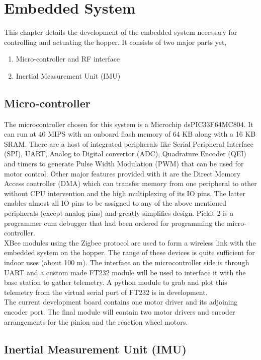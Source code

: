 \chapter{Embedded System}
\label{chap:embedded}
This chapter details the development of the embedded system necessary for controlling and actuating the hopper. It consists of two
major parts yet,
\begin{enumerate}
\item
Micro-controller and RF interface
\item
Inertial Measurement Unit (IMU)
\end{enumerate}

\section{Micro-controller}
The microcontroller chosen for this system is a Microchip dsPIC33F64MC804. It can run at 40 MIPS with an onboard flash memory of
64 KB along with a 16 KB SRAM. There are a host of integrated peripherals like Serial Peripheral Interface (SPI), UART, Analog to
Digital convertor (ADC), Quadrature Encoder (QEI) and timers to generate Pulse Width Modulation (PWM) that can be used for motor
control.
Other major features provided with it are the Direct Memory Access controller (DMA) which can transfer memory from one peripheral
to other without CPU intervention and the high multiplexing of its IO pins. The latter enables almost all IO pins to be assigned
to any of the above mentioned peripherals (except analog pins) and greatly simplifies design. Pickit 2 is a programmer cum
debugger that had been ordered for programming the micro-controller.\\

XBee modules using the Zigbee protocol are used to form a wireless link with the embedded system on the hopper. The range of these
devices is quite sufficient for indoor uses (about 100 m). The interface on the microcontroller side is through UART and a custom
made FT232 module will be used to interface it with the base station to gather telemetry. A python module to grab and plot this 
telemetry from the virtual serial port of FT232 is in development.\\

The current development board contains one motor driver and its adjoining encoder port. The final module will contain two motor
drivers and encoder arrangements for the pinion and the reaction wheel motors.

\section{Inertial Measurement Unit (IMU)}

